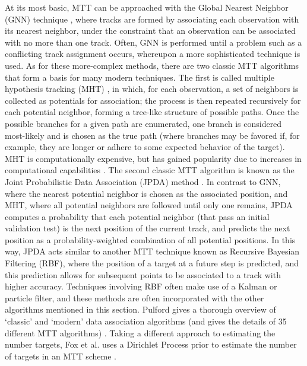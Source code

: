 \documentclass{article}
\begin{document}
At its most basic, MTT can be approached with the Global Nearest Neighbor (GNN) technique \citep{blackman_2004}, where tracks are formed by associating each observation with its nearest neighbor, under the constraint that an observation can be associated with no more than one track. Often, GNN is performed until a problem such as a conflicting track assignment occurs, whereupon a more sophisticated technique is used. As for these more-complex methods, there are two classic MTT algorithms that form a basis for many modern techniques. The first is called multiple hypothesis tracking (MHT) \citep{singer_1974, reid_1979, blackman_2004}, in which, for each observation, a set of neighbors is collected as potentials for association; the process is then repeated recursively for each potential neighbor, forming a tree-like structure of possible paths. Once the possible branches for a given path are enumerated, one branch is considered most-likely and is chosen as the true path (where branches may be favored if, for example, they are longer or adhere to some expected behavior of the target). MHT is computationally expensive, but has gained popularity due to increases in computational capabilities \citep{blackman_2004}. The second classic MTT algorithm is known as the Joint Probabilistic Data Association (JPDA) method \citep{barshalom_1975, kirubarajan_2004}. In contrast to GNN, where the nearest potential neighbor is chosen as the associated position, and MHT, where all potential neighbors are followed until only one remains, JPDA computes a probability that each potential neighbor (that pass an initial validation test) is the next position of the current track, and predicts the next position as a probability-weighted combination of all potential positions. In this way, JPDA acts similar to another MTT technique known as Recursive Bayesian Filtering (RBF), where the position of a target at a future step is predicted, and this prediction allows for subsequent points to be associated to a track with higher accuracy. Techniques involving RBF often make use of a Kalman or particle filter, and these methods are often incorporated with the other algorithms mentioned in this section. Pulford gives a thorough overview of `classic' and `modern' data association algorithms (and gives the details of 35 different MTT algorithms) \citep{pulford_2005}. Taking a different approach to estimating the number targets, Fox et al. uses a Dirichlet Process prior to estimate the number of targets in an MTT scheme \citep{fox_2006}.
\end{document}
